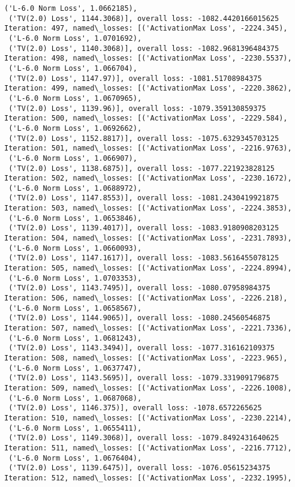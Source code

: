 \documentclass[10pt]{article}
\begin{document}
\begin{Verbatim}[commandchars=\\\{\}]
 ('L-6.0 Norm Loss', 1.0662185),
 ('TV(2.0) Loss', 1144.3068)], overall loss: -1082.4420166015625
Iteration: 497, named\_losses: [('ActivationMax Loss', -2224.345),
 ('L-6.0 Norm Loss', 1.0701692),
 ('TV(2.0) Loss', 1140.3068)], overall loss: -1082.9681396484375
Iteration: 498, named\_losses: [('ActivationMax Loss', -2230.5537),
 ('L-6.0 Norm Loss', 1.066704),
 ('TV(2.0) Loss', 1147.97)], overall loss: -1081.51708984375
Iteration: 499, named\_losses: [('ActivationMax Loss', -2220.3862),
 ('L-6.0 Norm Loss', 1.0670965),
 ('TV(2.0) Loss', 1139.96)], overall loss: -1079.359130859375
Iteration: 500, named\_losses: [('ActivationMax Loss', -2229.584),
 ('L-6.0 Norm Loss', 1.0692662),
 ('TV(2.0) Loss', 1152.8817)], overall loss: -1075.6329345703125
Iteration: 501, named\_losses: [('ActivationMax Loss', -2216.9763),
 ('L-6.0 Norm Loss', 1.066907),
 ('TV(2.0) Loss', 1138.6875)], overall loss: -1077.221923828125
Iteration: 502, named\_losses: [('ActivationMax Loss', -2230.1672),
 ('L-6.0 Norm Loss', 1.0688972),
 ('TV(2.0) Loss', 1147.8553)], overall loss: -1081.2430419921875
Iteration: 503, named\_losses: [('ActivationMax Loss', -2224.3853),
 ('L-6.0 Norm Loss', 1.0653846),
 ('TV(2.0) Loss', 1139.4017)], overall loss: -1083.9180908203125
Iteration: 504, named\_losses: [('ActivationMax Loss', -2231.7893),
 ('L-6.0 Norm Loss', 1.0660093),
 ('TV(2.0) Loss', 1147.1617)], overall loss: -1083.5616455078125
Iteration: 505, named\_losses: [('ActivationMax Loss', -2224.8994),
 ('L-6.0 Norm Loss', 1.0703353),
 ('TV(2.0) Loss', 1143.7495)], overall loss: -1080.07958984375
Iteration: 506, named\_losses: [('ActivationMax Loss', -2226.218),
 ('L-6.0 Norm Loss', 1.0658567),
 ('TV(2.0) Loss', 1144.9065)], overall loss: -1080.24560546875
Iteration: 507, named\_losses: [('ActivationMax Loss', -2221.7336),
 ('L-6.0 Norm Loss', 1.0681243),
 ('TV(2.0) Loss', 1143.3494)], overall loss: -1077.316162109375
Iteration: 508, named\_losses: [('ActivationMax Loss', -2223.965),
 ('L-6.0 Norm Loss', 1.0637747),
 ('TV(2.0) Loss', 1143.5695)], overall loss: -1079.3319091796875
Iteration: 509, named\_losses: [('ActivationMax Loss', -2226.1008),
 ('L-6.0 Norm Loss', 1.0687068),
 ('TV(2.0) Loss', 1146.375)], overall loss: -1078.6572265625
Iteration: 510, named\_losses: [('ActivationMax Loss', -2230.2214),
 ('L-6.0 Norm Loss', 1.0655411),
 ('TV(2.0) Loss', 1149.3068)], overall loss: -1079.8492431640625
Iteration: 511, named\_losses: [('ActivationMax Loss', -2216.7712),
 ('L-6.0 Norm Loss', 1.0676404),
 ('TV(2.0) Loss', 1139.6475)], overall loss: -1076.05615234375
Iteration: 512, named\_losses: [('ActivationMax Loss', -2232.1995),

\end{Verbatim}
\end{document}
